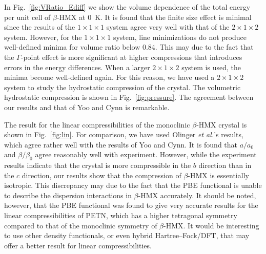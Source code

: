 \commentoutA{\documentclass[prl,aps,twocolumn,twocolumngrid,superbib]{revtex4}}
\begin{document}
In Fig.~\ref{fig:VRatio_Ediff} we show the volume dependence of the
total energy per unit cell of $\beta$-HMX at 0~K. It is found that the
finite size effect is minimal since the results of the $1\times 1
\times 1$ system agree very well with that of the
$2\times 1 \times 2 $ system. However, for the $1\times 1
\times 1 $ system, line minimizations do not produce well-defined minima
for volume ratio below 0.84.  This may due to the fact that the
$\Gamma$-point effect is more significant at higher compressions that
introduces errors in the energy differences.  When a larger $2\times 1
\times 2$ system is used, the minima become well-defined again. For
this reason, we have used a $2\times 1 \times 2 $ system to study the
hydrostatic compression of the crystal.  The volumetric hydrostatic
compression is shown in Fig.~\ref{fig:pressure}.  The agreement
between our results and that of Yoo and Cynn\cite{Yoo_1999v111} is
remarkable.

The result for the linear compressibilities of the monoclinic
$\beta$-HMX crystal is shown in Fig.~\ref{fig:lin}. For comparison, we
have used Olinger {\it et al.}'s results\cite{BOlinger78}, which agree
rather well with the results of Yoo and Cynn\cite{Yoo_1999v111}.  It
is found that $a/a_0$ and $\beta/\beta_0$ agree reasonably well with
experiment.  However, while the experiment results indicate that the
crystal is more compressible in the $b$ direction than in the $c$
direction, our results show that the compression of $\beta$-HMX is
essentially isotropic. This discrepancy may due to the fact that the
PBE functional is unable to describe the dispersion interactions in
$\beta$-HMX accurately\cite{WKohn98v80}. It should be noted, however,
that the PBE functional was found to give very accurate results for
the linear compressibilities of PETN, which has a higher tetragonal
symmetry compared to that of the monoclinic symmetry of $\beta$-HMX.
It would be interesting to use other density functionals, or even
hybrid Hartree--Fock/DFT\cite{ABecke93,CAdamo99B,XXu04}, that may
offer a better result for linear compressibilities.

\end{document}
